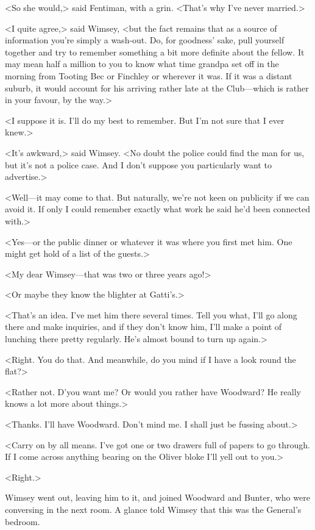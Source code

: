 <So she would,> said Fentiman, with a grin. <That's why I've never married.>

<I quite agree,> said Wimsey, <but the fact remains that as a source of information you're simply a wash-out. Do, for goodness' sake, pull yourself together and try to remember something a bit more definite about the fellow. It may mean half a million to you to know what time grandpa set off in the morning from Tooting Bec or Finchley or wherever it was. If it was a distant suburb, it would account for his arriving rather late at the Club—which is rather in your favour, by the way.>

<I suppose it is. I'll do my best to remember. But I'm not sure that I ever knew.>

<It's awkward,> said Wimsey. <No doubt the police could find the man for us, but it's not a police case. And I don't suppose you particularly want to advertise.>

<Well—it may come to that. But naturally, we're not keen on publicity if we can avoid it. If only I could remember exactly what work he said he'd been connected with.>

<Yes—or the public dinner or whatever it was where you first met him. One might get hold of a list of the guests.>

<My dear Wimsey—that was two or three years ago!>

<Or maybe they know the blighter at Gatti's.>

<That's an idea. I've met him there several times. Tell you what, I'll go along there and make inquiries, and if they don't know him, I'll make a point of lunching there pretty regularly. He's almost bound to turn up again.>

<Right. You do that. And meanwhile, do you mind if I have a look round the flat?>

<Rather not. D'you want me? Or would you rather have Woodward? He really knows a lot more about things.>

<Thanks. I'll have Woodward. Don't mind me. I shall just be fussing about.>

<Carry on by all means. I've got one or two drawers full of papers to go through. If I come across anything bearing on the Oliver bloke I'll yell out to you.>

<Right.>

Wimsey went out, leaving him to it, and joined Woodward and Bunter, who were conversing in the next room. A glance told Wimsey that this was the General's bedroom.

